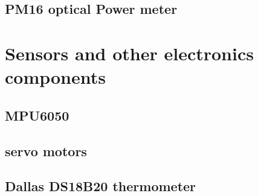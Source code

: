 \subsection{PM16 optical Power meter }

\section{Sensors and other electronics components}

\subsection{MPU6050}

\subsection{servo motors}

\subsection{Dallas DS18B20 thermometer}
